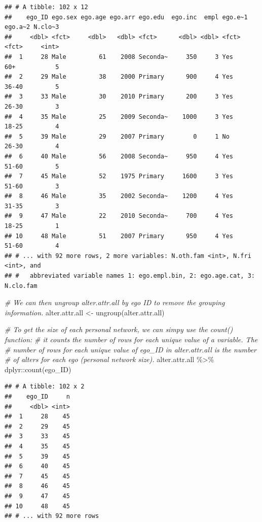 \documentclass[
]{book}
\newenvironment{Shaded}{\begin{snugshade}}{\end{snugshade}}
\newcommand{\CommentTok}[1]{\textcolor[rgb]{0.56,0.35,0.01}{\textit{#1}}}
\newcommand{\FunctionTok}[1]{\textcolor[rgb]{0.00,0.00,0.00}{#1}}
\newcommand{\NormalTok}[1]{#1}
\newcommand{\OtherTok}[1]{\textcolor[rgb]{0.56,0.35,0.01}{#1}}
\newcommand{\SpecialCharTok}[1]{\textcolor[rgb]{0.00,0.00,0.00}{#1}}
\begin{document}
\begin{verbatim}
## # A tibble: 102 x 12
##    ego_ID ego.sex ego.age ego.arr ego.edu  ego.inc  empl ego.e~1 ego.a~2 N.clo~3
##     <dbl> <fct>     <dbl>   <dbl> <fct>      <dbl> <dbl> <fct>   <fct>     <int>
##  1     28 Male         61    2008 Seconda~     350     3 Yes     60+           5
##  2     29 Male         38    2000 Primary      900     4 Yes     36-40         5
##  3     33 Male         30    2010 Primary      200     3 Yes     26-30         3
##  4     35 Male         25    2009 Seconda~    1000     3 Yes     18-25         4
##  5     39 Male         29    2007 Primary        0     1 No      26-30         4
##  6     40 Male         56    2008 Seconda~     950     4 Yes     51-60         5
##  7     45 Male         52    1975 Primary     1600     3 Yes     51-60         3
##  8     46 Male         35    2002 Seconda~    1200     4 Yes     31-35         3
##  9     47 Male         22    2010 Seconda~     700     4 Yes     18-25         1
## 10     48 Male         51    2007 Primary      950     4 Yes     51-60         4
## # ... with 92 more rows, 2 more variables: N.oth.fam <int>, N.fri <int>, and
## #   abbreviated variable names 1: ego.empl.bin, 2: ego.age.cat, 3: N.clo.fam
\end{verbatim}

\begin{Shaded}
\begin{Highlighting}[]
\CommentTok{\# We can then ungroup alter.attr.all by ego ID to remove the grouping information.}
\NormalTok{alter.attr.all }\OtherTok{\textless{}{-}} \FunctionTok{ungroup}\NormalTok{(alter.attr.all)}

\CommentTok{\# To get the size of each personal network, we can simpy use the count() function:}
\CommentTok{\# it counts the number of rows for each unique value of a variable. The}
\CommentTok{\# number of rows for each unique value of ego\_ID in alter.attr.all is the number}
\CommentTok{\# of alters for each ego (personal network size).}
\NormalTok{alter.attr.all }\SpecialCharTok{\%\textgreater{}\%} 
\NormalTok{  dplyr}\SpecialCharTok{::}\FunctionTok{count}\NormalTok{(ego\_ID)}
\end{Highlighting}
\end{Shaded}

\begin{verbatim}
## # A tibble: 102 x 2
##    ego_ID     n
##     <dbl> <int>
##  1     28    45
##  2     29    45
##  3     33    45
##  4     35    45
##  5     39    45
##  6     40    45
##  7     45    45
##  8     46    45
##  9     47    45
## 10     48    45
## # ... with 92 more rows
\end{verbatim}
\end{document}
